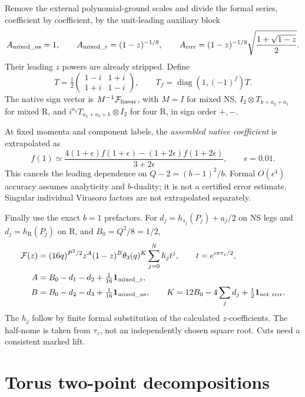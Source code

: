 \documentclass[11pt]{article}
\newcommand{\R}{\mathrm{R}}
\newcommand{\F}{\mathcal F}
\begin{document}
Remove the external polynomial-ground scales and divide the formal
series, coefficient by coefficient, by the unit-leading auxiliary block
\begin{equation}
 A_{\rm mixed\_ns}=1,\qquad
 A_{\rm mixed\_r}=(1-z)^{-1/8},\qquad
 A_{\rm rrrr}=(1-z)^{-1/8}\sqrt{\frac{1+\sqrt{1-z}}2}.
\end{equation}
Their leading \(z\) powers are already stripped. Define
\[
 T=\tfrac12\begin{pmatrix}1-i&1+i\\1+i&1-i\end{pmatrix},\qquad
 T_f=\operatorname{diag}(1,(-1)^f)T.
\]
The native sign vector is \(M^{-1}\F_{\rm linear}\), with \(M=I\)
for mixed NS, \(I_2\otimes T_{k+a_2+a_1}\) for mixed R, and
\(i^{a_4}T_{a_4+a_3+k}\otimes I_2\) for four R, in sign order \(+,-\).

At fixed momenta and component labels, the \emph{assembled native
coefficient} is extrapolated as
\begin{equation}
 f(1)\simeq
 \frac{4(1+\epsilon)f(1+\epsilon)-(1+2\epsilon)f(1+2\epsilon)}
 {3+2\epsilon},\qquad \epsilon=0.01.
 \label{eq:extrapolation}
\end{equation}
This cancels the leading dependence on \(Q-2=(b-1)^2/b\).
Formal \(O(\epsilon^4)\) accuracy assumes analyticity and \(b\)-duality;
it is not a certified error estimate. Singular individual Virasoro
factors are not extrapolated separately.

Finally use the exact \(b=1\) prefactors. For
\(d_j=h_{s_j}(P_j)+a_j/2\) on NS legs and \(d_j=h_\R(P_j)\) on R,
and \(B_0=Q^2/8=1/2\),
\begin{align}
 \F(z)&=(16q)^{P^2/2}z^A(1-z)^B\theta_3(q)^K
                         \sum_{j=0}^{N}h_jt^j,\qquad t=e^{i\pi\tau_z/2},\\
 A&=B_0-d_1-d_2+\tfrac1{16}{\bf1}_{\rm mixed\_r},\\
 B&=B_0-d_2-d_3+\tfrac1{16}{\bf1}_{\rm mixed\_ns},\qquad
 K=12B_0-4\sum_jd_j+\tfrac12{\bf1}_{\rm not\ rrrr}.
\end{align}
The \(h_j\) follow by finite formal substitution of the calculated
\(z\)-coefficients. The half-nome is taken from \(\tau_z\), not an
independently chosen square root. Cuts need a consistent marked lift.

\section{Torus two-point decompositions}
\end{document}
